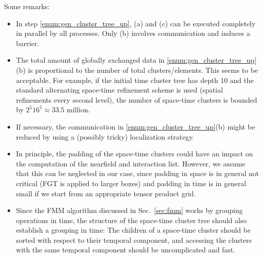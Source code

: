 \documentclass[a4paper,11pt]{article}
\theoremstyle{plain}
\theoremstyle{definition}
\theoremstyle{remark}
\begin{document}
Some remarks: 
\begin{itemize}
  \item In step \ref{enum:gen_cluster_tree_up}, (a) and (c) can be executed completely in parallel by all processes. Only (b) involves communication and induces a barrier.
  \item The total amount of globally exchanged data in \ref{enum:gen_cluster_tree_up}(b) is proportional to the number of total clusters/elements. This seems to be acceptable. For example, if the initial time cluster tree has depth 10 and the standard alternating space-time refinement scheme is used (spatial refinements every second level), the number of space-time clusters is bounded by $2^5 16^5 \approx 33.5$ million. 
  \item If necessary, the communication in \ref{enum:gen_cluster_tree_up}(b) might be reduced by using a (possibly tricky) localization strategy.
  \item In principle, the padding of the space-time clusters could have an impact on the computation of the nearfield and interaction list. However, we assume that this can be neglected in our case, since padding in space is in general not critical (FGT is applied to larger boxes) and padding in time is in general small if we start from an appropriate tensor product grid.
  \item Since the FMM algorithm discussed in Sec.~\ref{sec:fmm} works by grouping operations in time, the structure of the space-time cluster tree should also establish a grouping in time: The children of a space-time cluster should be sorted with respect to their temporal component, and accessing the clusters with the same temporal component should be uncomplicated and fast.
\end{itemize}
\end{document}
